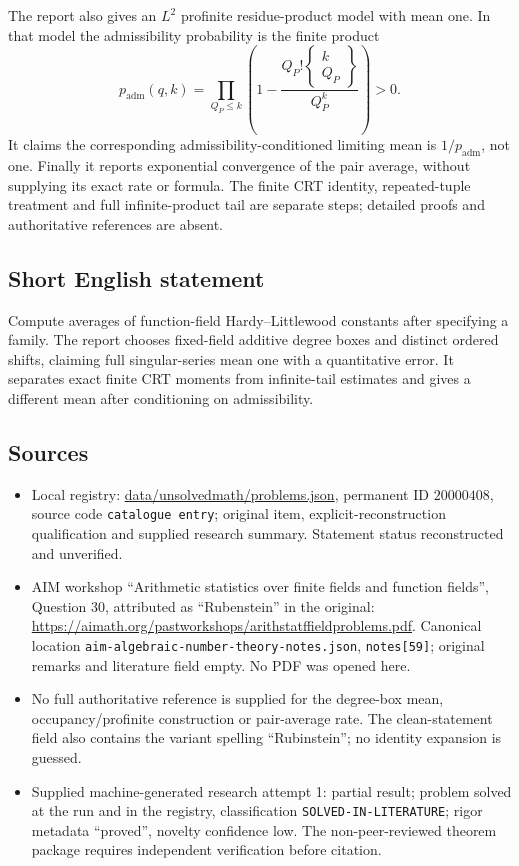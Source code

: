 \documentclass[11pt]{article}
\newcommand{\Q}{\mathbb{Q}}
\begin{document}
The report also gives an $L^2$ profinite residue-product model with mean one. In that model the admissibility probability is the finite product
\[
 p_{\mathrm{adm}}(q,k)=\prod_{Q_P\leq k}
 \left(1-\frac{Q_P!\left\{\begin{smallmatrix}k\\Q_P\end{smallmatrix}\right\}}{Q_P^k}\right)>0.
\]
It claims the corresponding admissibility-conditioned limiting mean is $1/p_{\mathrm{adm}}$, not one. Finally it reports exponential convergence of the pair average, without supplying its exact rate or formula. The finite CRT identity, repeated-tuple treatment and full infinite-product tail are separate steps; detailed proofs and authoritative references are absent.
\subsection{Short English statement}
Compute averages of function-field Hardy--Littlewood constants after specifying a family. The report chooses fixed-field additive degree boxes and distinct ordered shifts, claiming full singular-series mean one with a quantitative error. It separates exact finite CRT moments from infinite-tail estimates and gives a different mean after conditioning on admissibility.
\subsection{Sources}
\begin{itemize}
\item Local registry: \url{data/unsolvedmath/problems.json}, permanent ID $20000408$, source code \texttt{catalogue entry}; original item, explicit-reconstruction qualification and supplied research summary. Statement status reconstructed and unverified.
\item AIM workshop ``Arithmetic statistics over finite fields and function fields'', Question 30, attributed as ``Rubenstein'' in the original: \url{https://aimath.org/pastworkshops/arithstatffieldproblems.pdf}. Canonical location \texttt{aim-algebraic-number-theory-notes.json}, \texttt{notes[59]}; original remarks and literature field empty. No PDF was opened here.
\item No full authoritative reference is supplied for the degree-box mean, occupancy/profinite construction or pair-average rate. The clean-statement field also contains the variant spelling ``Rubinstein''; no identity expansion is guessed.
\item Supplied machine-generated research attempt 1: partial result; problem solved at the run and in the registry, classification \texttt{SOLVED-IN-LITERATURE}; rigor metadata ``proved'', novelty confidence low. The non-peer-reviewed theorem package requires independent verification before citation.
\end{itemize}
\end{document}
